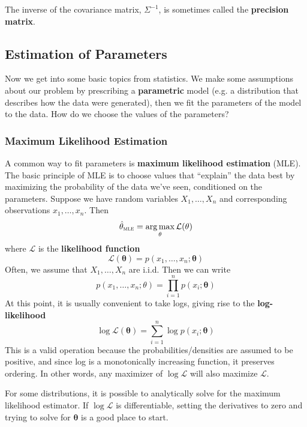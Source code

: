 \documentclass{article}
\DeclareMathOperator*{\argmax}{arg\,max}
\renewcommand{\vec}[1]{\mathbf{#1}}
\newcommand{\inv}{^{-1}}
\newcommand{\term}[1]{\textbf{#1}}
\begin{document}
The inverse of the covariance matrix, $\Sigma\inv$, is sometimes called the \term{precision matrix}.

\subsection{Estimation of Parameters}
Now we get into some basic topics from statistics. We make some assumptions about our problem by prescribing a \term{parametric} model (e.g. a distribution that describes how the data were generated), then we fit the parameters of the model to the data. How do we choose the values of the parameters?

\subsubsection{Maximum Likelihood Estimation}
A common way to fit parameters is \term{maximum likelihood estimation} (MLE). The basic principle of MLE is to choose values that ``explain'' the data best by maximizing the probability of the data we've seen, conditioned on the parameters. Suppose we have random variables $X_1, \dots, X_n$ and corresponding observations $x_1, \dots, x_n$. Then
\[\hat{\vec{\theta}}_\textsc{mle} = \argmax_\vec{\theta} \mathcal{L}(\vec{\theta})\]
where $\mathcal L$ is the \term{likelihood function}
\[\mathcal{L}(\vec{\theta}) = p(x_1, \dots, x_n; \vec{\theta})\]
Often, we assume that $X_1, \dots, X_n$ are i.i.d. Then we can write
\[p(x_1, \dots, x_n; \theta) = \prod_{i=1}^n p(x_i; \vec{\theta})\]
At this point, it is usually convenient to take logs, giving rise to the \term{log-likelihood}
\[\log\mathcal{L}(\vec{\theta}) = \sum_{i=1}^n \log p(x_i; \vec{\theta})\]
This is a valid operation because the probabilities/densities are assumed to be positive, and since log is a monotonically increasing function, it preserves ordering. In other words, any maximizer of $\log \mathcal L$ will also maximize $\mathcal L$.

For some distributions, it is possible to analytically solve for the maximum likelihood estimator. If $\log\mathcal{L}$ is differentiable, setting the derivatives to zero and trying to solve for $\vec{\theta}$ is a good place to start.
\end{document}
